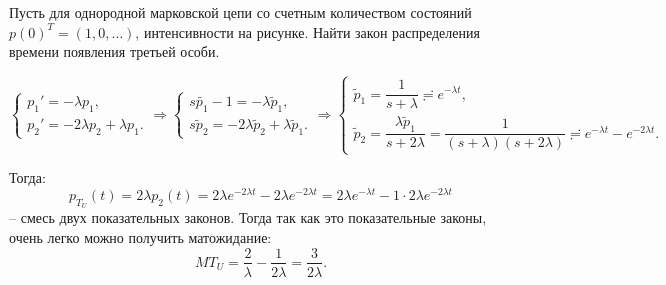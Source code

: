 \begin{ex}
  Пусть для однородной марковской цепи со счетным количеством состояний 
  $p(0)^T = (1, 0, \dots)$, интенсивности на рисунке.
  Найти закон распределения времени появления третьей особи.
  \begin{figure}[h!]
    \centering
  \end{figure}

  \[
    \begin{cases}
      p_1' = - \lambda p_1, \\
      p_2' = -2 \lambda p_2 + \lambda p_1.
    \end{cases}
    \Rightarrow
    \begin{cases}
      s \tilde{p_1} - 1 = - \lambda \tilde p_1, \\
      s \tilde p_2 = - 2 \lambda \tilde p_2 + \lambda \tilde p_1.
    \end{cases}
    \Rightarrow
    \begin{cases}
      \tilde p_1 = \dfrac{1}{s+\lambda} \risingdotseq e^{-\lambda t}, \\
      \tilde p_2 = \dfrac{\lambda \tilde p_1}{s+2\lambda} 
      = \dfrac{1}{(s+\lambda)(s+2\lambda)} \risingdotseq e^{-\lambda t} - e^{-2\lambda t}.
    \end{cases}
  \]

  Тогда:
  \[
    p_{T_U} (t) = 2\lambda p_2(t) = 2\lambda e^{-2\lambda t} - 2\lambda e^{-2\lambda t}
    = 2 \lambda e^{-\lambda t} - 1 \cdot 2\lambda e^{-2\lambda t}
  \]
  -- смесь двух показательных законов.
  Тогда так как это показательные законы, очень легко можно получить матожидание:
  \[
    MT_U = \dfrac{2}{\lambda} - \dfrac{1}{2\lambda} = \dfrac{3}{2\lambda}.
  \]
\end{ex}



